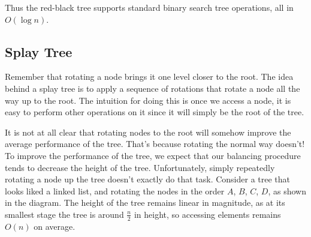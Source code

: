 Thus the red-black tree supports standard binary search tree operations, all in $O(\log{n})$.

\subsection{Splay Tree}

Remember that rotating a node brings it one level closer to the root. The idea behind a splay tree is to apply a sequence of rotations that rotate a node all the way up to the root. The intuition for doing this is once we access a node, it is easy to perform other operations on it since it will simply be the root of the tree.

It is not at all clear that rotating nodes to the root will somehow improve the average performance of the tree. That's because rotating the normal way doesn't! To improve the performance of the tree, we expect that our balancing procedure tends to decrease the height of the tree. Unfortunately, simply repeatedly rotating a node up the tree doesn't exactly do that task. Consider a tree that looks liked a linked list, and rotating the nodes in the order $A$, $B$, $C$, $D$, as shown in the diagram. The height of the tree remains linear in magnitude, as at its smallest stage the tree is around $\frac{n}{2}$ in height, so accessing elements remains $O(n)$ on average.

